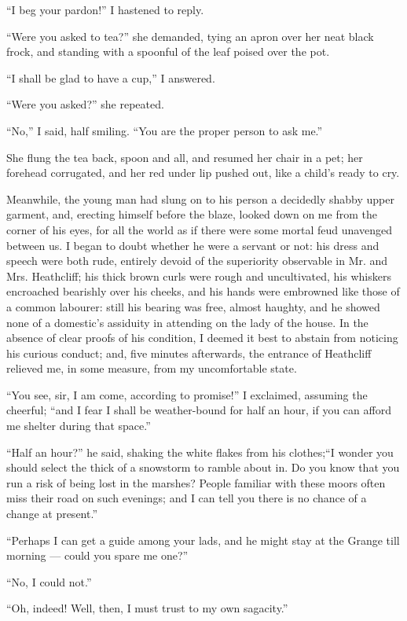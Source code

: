 \par “I beg your pardon!” I hastened to reply.
\par “Were you asked to tea?” she demanded, tying an apron over her neat black frock, and standing with a spoonful of the leaf poised over the pot.
\par “I shall be glad to have a cup,” I answered.
\par “Were you asked?” she repeated.
\par “No,” I said, half smiling. “You are the proper person to ask me.”
\par She flung the tea back, spoon and all, and resumed her chair in a pet; her forehead corrugated, and her red under lip pushed out, like a child's ready to cry.
\par Meanwhile, the young man had slung on to his person a decidedly shabby upper garment, and, erecting himself before the blaze, looked down on me from the corner of his eyes, for all the world as if there were some mortal feud unavenged between us. I began to doubt whether he were a servant or not: his dress and speech were both rude, entirely devoid of the superiority observable in Mr. and Mrs. Heathcliff; his thick brown curls were rough and uncultivated, his whiskers encroached bearishly over his cheeks, and his hands were embrowned like those of a common labourer: still his bearing was free, almost haughty, and he showed none of a domestic's assiduity in attending on the lady of the house. In the absence of clear proofs of his condition, I deemed it best to abstain from noticing his curious conduct; and, five minutes afterwards, the entrance of Heathcliff relieved me, in some measure, from my uncomfortable state.
\par “You see, sir, I am come, according to promise!” I exclaimed, assuming the cheerful; “and I fear I shall be weather-bound for half an hour, if you can afford me shelter during that space.”
\par “Half an hour?” he said, shaking the white flakes from his clothes;“I wonder you should select the thick of a snowstorm to ramble about in. Do you know that you run a risk of being lost in the marshes? People familiar with these moors often miss their road on such evenings; and I can tell you there is no chance of a change at present.”
\par “Perhaps I can get a guide among your lads, and he might stay at the Grange till morning — could you spare me one?”
\par “No, I could not.”
\par “Oh, indeed! Well, then, I must trust to my own sagacity.”
